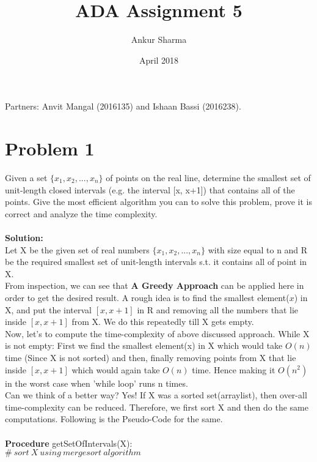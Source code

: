 \documentclass{article}
\title{ADA Assignment 5}
\author{Ankur Sharma}
\date{April 2018}
\newcommand\tab[1][4mm]{\hspace*{#1}}
\begin{document}
\maketitle
\section*{}
Partners: Anvit Mangal (2016135) and Ishaan Bassi (2016238).

\section*{Problem 1}
Given a set $\{x_1, x_2, . . . , x_n\}$ of points on the real line, determine the smallest set of unit-length closed intervals (e.g. the interval [x, x+1]) that contains all of the points. Give the most efficient algorithm you can to solve this problem, prove it is correct and analyze the time complexity. \\
\vspace{1mm} \\
\textbf{Solution:} \\  
Let X be the given set of real numbers $\{x_1, x_2, . . . , x_n\}$ with size equal to n and R be the required smallest set of unit-length intervals s.t. it contains all of point in X. \\
From inspection, we can see that \textbf{A Greedy Approach} can be applied here in order to get the desired result. A rough idea is to find the smallest element($x$) in X, and put the interval $[x, x+1]$ in R and removing all the numbers that lie inside $[x, x+1]$ from X. We do this repeatedly till X gets empty. \\
Now, let's to compute the time-complexity of above discussed approach. While X is not empty: First we find the smallest element(x) in X which would take $O(n)$ time (Since X is not sorted) and then, finally removing points from X that lie inside $[x, x+1]$ which would again take $O(n)$ time. Hence making it $O(n^2)$ in the worst case when 'while loop' runs n times. \\
Can we think of a better way? Yes! If X was a sorted set(arraylist), then over-all time-complexity can be reduced. Therefore, we first sort X and then do the same computations. Following is the Pseudo-Code for the same. \\
\vspace{0.5mm} \\
\textbf{Procedure} getSetOfIntervals(X): \\
\tab $\#\ sort\ X\ using\ mergesort\ algorithm$ \\
\end{document}
